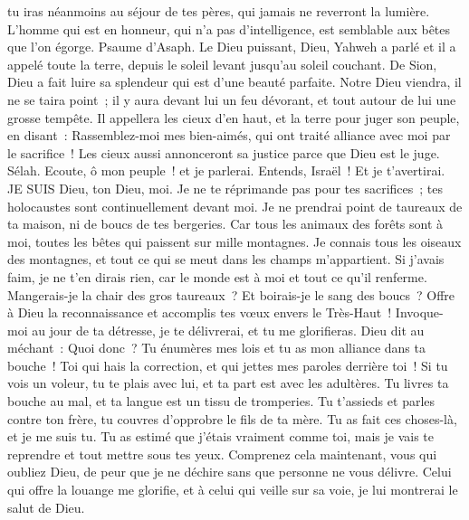 \begin{multicols}{2}
tu iras néanmoins au séjour de tes pères, qui jamais ne reverront la lumière.
L'homme qui est en honneur, qui n'a pas d'intelligence, est semblable aux bêtes que l'on égorge.
\VerseOne{}Psaume d'Asaph. Le Dieu puissant, Dieu, Yahweh a parlé et il a appelé toute la terre, depuis le soleil levant jusqu'au soleil couchant.
De Sion, Dieu a fait luire sa splendeur qui est d'une beauté parfaite.
Notre Dieu viendra, il ne se taira point~; il y aura devant lui un feu dévorant, et tout autour de lui une grosse tempête.
Il appellera les cieux d'en haut, et la terre pour juger son peuple, en disant~:
Rassemblez-moi mes bien-aimés, qui ont traité alliance avec moi par le sacrifice~!
Les cieux aussi annonceront sa justice parce que Dieu est le juge. Sélah.
Ecoute, ô mon peuple~! et je parlerai. Entends, Israël~! Et je t'avertirai. JE SUIS Dieu, ton Dieu, moi.
Je ne te réprimande pas pour tes sacrifices~; tes holocaustes sont continuellement devant moi.
Je ne prendrai point de taureaux de ta maison, ni de boucs de tes bergeries.
Car tous les animaux des forêts sont à moi, toutes les bêtes qui paissent sur mille montagnes.
Je connais tous les oiseaux des montagnes, et tout ce qui se meut dans les champs m'appartient.
Si j'avais faim, je ne t'en dirais rien, car le monde est à moi et tout ce qu'il renferme.
Mangerais-je la chair des gros taureaux~? Et boirais-je le sang des boucs~?
Offre à Dieu la reconnaissance et accomplis tes vœux envers le Très-Haut~!
Invoque-moi au jour de ta détresse, je te délivrerai, et tu me glorifieras.
Dieu dit au méchant~: Quoi donc~? Tu énumères mes lois et tu as mon alliance dans ta bouche~!
Toi qui hais la correction, et qui jettes mes paroles derrière toi~!
Si tu vois un voleur, tu te plais avec lui, et ta part est avec les adultères.
Tu livres ta bouche au mal, et ta langue est un tissu de tromperies.
Tu t'assieds et parles contre ton frère, tu couvres d'opprobre le fils de ta mère.
Tu as fait ces choses-là, et je me suis tu. Tu as estimé que j'étais vraiment comme toi, mais je vais te reprendre et tout mettre sous tes yeux.
Comprenez cela maintenant, vous qui oubliez Dieu, de peur que je ne déchire sans que personne ne vous délivre.
Celui qui offre la louange me glorifie, et à celui qui veille sur sa voie, je lui montrerai le salut de Dieu.

\end{multicols}

